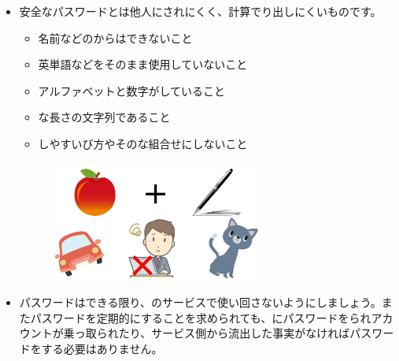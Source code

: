 \documentclass[a4paper,12pt]{jarticle}
\begin{document}
\begin{enumerate}
\begin{itemize}
          \item
                安全なパスワードとは他人にされにくく、計算でり出しにくいものです。
          \begin{itemize}
            \item 
              名前などのからはできないこと
              \item   
              英単語などをそのまま使用していないこと
              \item   
              アルファベットと数字がしていること
              \item 
              な長さの文字列であること
              \item 
              しやすいび方やそのな組合せにしないこと
            \end{itemize}
                \begin{figure}[h]
                  \centering
                  \begin{minipage}{5.228cm}
                    {\upshape
                      \includegraphics[width=7.000cm]{pswd_image_imp11.pdf}
                      }
                  \end{minipage}
                  \end{figure}  
             \item   パスワードはできる限り、のサービスで使い回さないようにしましょう。またパスワードを定期的にすることを求められても、にパスワードをられアカウントが乗っ取られたり、サービス側から流出した事実がなければパスワードをする必要はありません。
                     

\end{itemize}
\end{enumerate}
\end{document}
